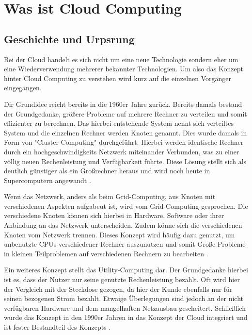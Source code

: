 \chapter{Was ist \Gls{Cloud Computing}}\label{ch:2}
\section{Geschichte und Urpsrung}
Bei der Cloud handelt es sich nicht um eine neue Technologie sondern eher um eine Wiederverwendung mehrerer bekannter Technologien. Um also das Konzept hinter Cloud Computing zu verstehen wird kurz auf die einzelnen Vorgänger eingegangen.

Dir Grundidee reicht bereits in die 1960er Jahre zurück. Bereits damals bestand der Grundgedanke, größere Probleme auf mehrere Rechner zu verteilen und somit effizienter zu berechnen. Das hierbei entstehende System nennt sich verteiltes System und die einzelnen Rechner werden Knoten genannt. Dies wurde damals in Form von "Cluster Computing" durchgeführt. Hierbei werden identische Rechner durch ein hochgeschwindigkeits Netzwerk miteinander Verbunden, was zu einer völlig neuen Rechenleistung und Verfügbarkeit führte. Diese Lösung stellt sich als deutlich günstiger als ein Großrechner heraus und wird noch heute in Supercomputern angewandt \cite*[]{DAAS}.

Wenn das Netzwerk, anders als beim Grid-Computing, aus Knoten mit verschiedenen Aspekten aufgabeut ist, wird vom Grid-Computing gesprochen. Die verschiedene Knoten können sich hierbei in Hardware, Software oder ihrer Anbindung an das Netzwerk unterscheiden. Zudem könne sich die verschiedenen Knoten vom Netzwerk trennen. Dieses Konzept wird häufig dazu genutzt, um unbenutzte CPUs verschiedener Rechner auszunutzen und somit Große Probleme in kleinen Teilproblemen auf verschiedenen Rechnern zu bearbeiten \cite*[]{DAAS}.

Ein weiteres Konzept stellt das Utility-Computing dar. Der Grundgedanke hierbei ist es, dass der Nutzer nur seine genutzte Rechenleistung bezahlt. Oft wird hier der Vergleich mit der Steckdose gezogen, da hier der Kunde ebenfalls nur für seinen bezogenen Strom bezahlt\cite*[]{TUB}. Etwaige Überlegungen sind jedoch an der nicht verfügbaren Hardware und dem mangelhaften Netzausbau gescheitert. Schließlich wurde das Konzept in den 1990er Jahren in das Konzept der Cloud integriert und ist fester Bestandteil des Konzepts \cite*[]{DAAS}.


